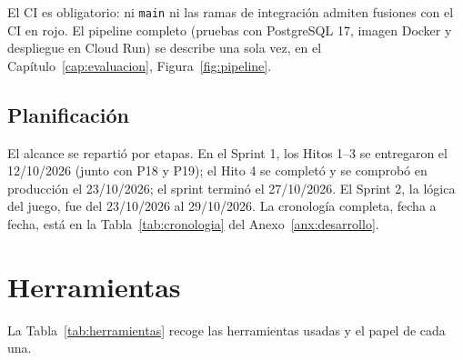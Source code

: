 El CI es obligatorio: ni \texttt{main} ni las ramas de integración admiten fusiones con el CI en rojo. El pipeline completo (pruebas con PostgreSQL 17, imagen Docker y despliegue en Cloud Run) se describe una sola vez, en el Capítulo~\ref{cap:evaluacion}, Figura~\ref{fig:pipeline}.

\subsection{Planificación}

El alcance se repartió por etapas. En el Sprint 1, los Hitos 1--3 se entregaron el 12/10/2026 (junto con P18 y P19); el Hito 4 se completó y se comprobó en producción el 23/10/2026; el sprint terminó el 27/10/2026. El Sprint 2, la lógica del juego, fue del 23/10/2026 al 29/10/2026. La cronología completa, fecha a fecha, está en la Tabla~\ref{tab:cronologia} del Anexo~\ref{anx:desarrollo}.

\section{Herramientas}

La Tabla~\ref{tab:herramientas} recoge las herramientas usadas y el papel de cada una.

